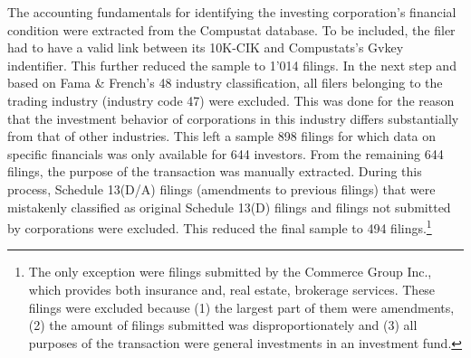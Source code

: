 \documentclass[12pt]{article}
\begin{document}
The accounting fundamentals for identifying the investing corporation's financial condition were extracted from the Compustat database. To be included, the filer had to have a valid link between its 10K-CIK and Compustats's Gvkey indentifier. This further reduced the sample to 1'014 filings. In the next step and based on Fama \& French's 48 industry classification, all filers belonging to the trading industry (industry code 47) were excluded. This was done for the reason that the investment behavior of corporations in this industry differs substantially from that of other industries. This left a sample 898 filings for which data on specific financials was only available for 644 investors. From the remaining 644 filings, the purpose of the transaction was manually extracted. During this process, Schedule 13(D/A) filings (amendments to previous filings) that were mistakenly classified as original Schedule 13(D) filings and filings not submitted by corporations were excluded. This reduced the final sample to 494 filings.\footnote{The only exception were filings submitted by the Commerce Group Inc., which provides both insurance and, real estate, brokerage services. These filings were excluded because (1) the largest part of them were amendments, (2) the amount of filings submitted was disproportionately and (3) all purposes of the transaction were general investments in an investment fund.} 
\end{document}
